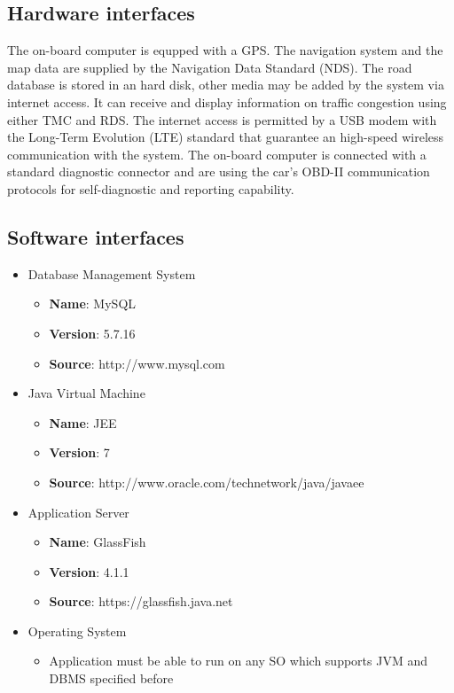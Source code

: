 \newpage
\subsection{Hardware interfaces}
The on-board computer is equpped with a GPS. The  navigation system and the map data are supplied by the Navigation Data Standard (NDS). The road database is stored in an hard disk, other media may be added by the system via internet access. It can receive and display information on traffic congestion using either TMC and RDS.
The internet access is permitted by a USB modem with the Long-Term Evolution (LTE) standard that guarantee an high-speed wireless communication with the system.
The on-board computer is connected with a standard diagnostic connector and are using the car's OBD-II communication protocols for self-diagnostic and reporting capability.

\subsection{Software interfaces}
\begin{itemize}
	\item{Database Management System
		\begin{itemize}
			\item{{\bf Name}: MySQL}
			\item{{\bf Version}: 5.7.16}
			\item{{\bf Source}: http://www.mysql.com}
		\end{itemize}
	}
	\item{Java Virtual Machine
		\begin{itemize}
			\item{{\bf Name}: JEE}
			\item{{\bf Version}: 7}
			\item{{\bf Source}: http://www.oracle.com/technetwork/java/javaee}
		\end{itemize}
	}
	\item{Application Server
		\begin{itemize}
			\item{{\bf Name}: GlassFish}
			\item{{\bf Version}: 4.1.1}
			\item{{\bf Source}: https://glassfish.java.net}
		\end{itemize}
	}
	\item{Operating System
		\begin{itemize}
			\item{Application must be able to run on any SO which supports JVM and
				  DBMS specified before}
		\end{itemize}
	}

\end{itemize}

